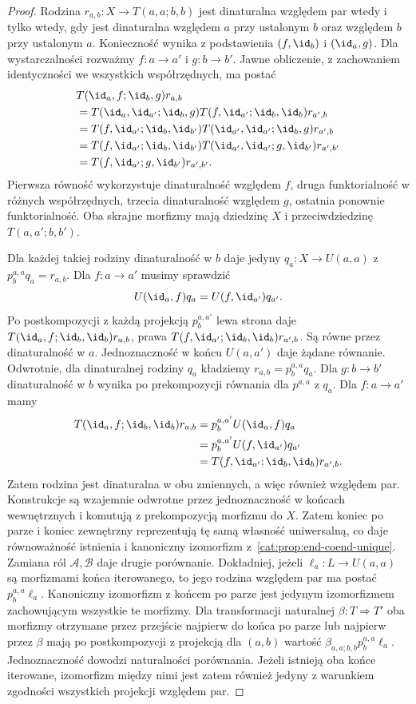 \begin{proof}
Rodzina $r_{a,b}:X\to T(a,a;b,b)$ jest dinaturalna względem par wtedy i tylko wtedy, gdy jest dinaturalna względem $a$ przy ustalonym $b$ oraz względem $b$ przy ustalonym $a$. Konieczność wynika z podstawienia $(f,\id_b)$ i $(\id_a,g)$. Dla wystarczalności rozważmy $f:a\to a'$ i $g:b\to b'$. Jawne obliczenie, z zachowaniem identyczności we wszystkich współrzędnych, ma postać
\begin{align*}
&T(\id_a,f;\id_b,g)r_{a,b}\\
&=T(\id_a,\id_{a'};\id_b,g)
  T(f,\id_{a'};\id_b,\id_b)r_{a',b}\\
&=T(f,\id_{a'};\id_b,\id_{b'})
  T(\id_{a'},\id_{a'};\id_b,g)r_{a',b}\\
&=T(f,\id_{a'};\id_b,\id_{b'})
  T(\id_{a'},\id_{a'};g,\id_{b'})r_{a',b'}\\
&=T(f,\id_{a'};g,\id_{b'})r_{a',b'} .
\end{align*}
Pierwsza równość wykorzystuje dinaturalność względem $f$, druga funktorialność w różnych współrzędnych, trzecia dinaturalność względem $g$, ostatnia ponownie funktorialność. Oba skrajne morfizmy mają dziedzinę $X$ i przeciwdziedzinę $T(a,a';b,b')$.

Dla każdej takiej rodziny dinaturalność w $b$ daje jedyny $q_a:X\to U(a,a)$ z $p^{a,a}_b q_a=r_{a,b}$. Dla $f:a\to a'$ musimy sprawdzić
\[
 U(\id_a,f)q_a=U(f,\id_{a'})q_{a'}.
\]
Po postkompozycji z każdą projekcją $p^{a,a'}_b$ lewa strona daje $T(\id_a,f;\id_b,\id_b)r_{a,b}$, prawa $T(f,\id_{a'};\id_b,\id_b)r_{a',b}$. Są równe przez dinaturalność w $a$. Jednoznaczność w końcu $U(a,a')$ daje żądane równanie. Odwrotnie, dla dinaturalnej rodziny $q_a$ kładziemy $r_{a,b}=p^{a,a}_b q_a$. Dla $g:b\to b'$ dinaturalność w $b$ wynika po prekompozycji równania dla $p^{a,a}$ z $q_a$. Dla $f:a\to a'$ mamy
\begin{align*}
 T(\id_a,f;\id_b,\id_b)r_{a,b}
 &=p^{a,a'}_b U(\id_a,f)q_a\\
 &=p^{a,a'}_b U(f,\id_{a'})q_{a'}\\
 &=T(f,\id_{a'};\id_b,\id_b)r_{a',b}.
\end{align*}
Zatem rodzina jest dinaturalna w obu zmiennych, a więc również względem par. Konstrukcje są wzajemnie odwrotne przez jednoznaczność w końcach wewnętrznych i komutują z prekompozycją morfizmu do $X$. Zatem koniec po parze i koniec zewnętrzny reprezentują tę samą własność uniwersalną, co daje równoważność istnienia i kanoniczny izomorfizm z~\ref{cat:prop:end-coend-unique}. Zamiana ról $\mathcal A,\mathcal B$ daje drugie porównanie. Dokładniej, jeżeli $\ell_a:L\to U(a,a)$ są morfizmami końca iterowanego, to jego rodzina względem par ma postać $p^{a,a}_b\ell_a$. Kanoniczny izomorfizm z końcem po parze jest jedynym izomorfizmem zachowującym wszystkie te morfizmy. Dla transformacji naturalnej $\beta:T\Rightarrow T'$ oba morfizmy otrzymane przez przejście najpierw do końca po parze lub najpierw przez $\beta$ mają po postkompozycji z projekcją dla $(a,b)$ wartość $\beta_{a,a;b,b}p^{a,a}_b\ell_a$. Jednoznaczność dowodzi naturalności porównania. Jeżeli istnieją oba końce iterowane, izomorfizm między nimi jest zatem również jedyny z warunkiem zgodności wszystkich projekcji względem par.
\end{proof}
